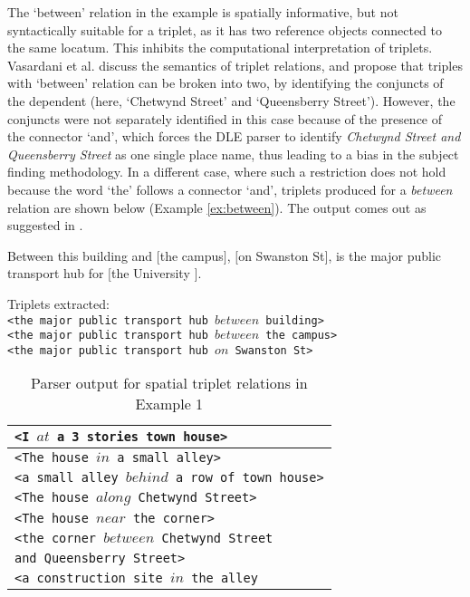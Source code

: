 \documentclass{acm_proc_article-sp}
\begin{document}
The `between' relation in the example is spatially informative, but not syntactically suitable for a triplet, as it has two reference objects connected to the same locatum. This inhibits the computational interpretation of triplets. Vasardani et al. \cite{maria:descriptions} discuss the semantics of triplet relations, and propose that triples with `between' relation can be broken into two, by identifying the conjuncts of the dependent (here, `Chetwynd Street' and `Queensberry Street'). However, the conjuncts were not separately identified in this case because of the presence of the connector `and', which forces the DLE parser to identify \textit{Chetwynd Street and Queensberry Street} as one single place name, thus leading to a bias in the subject finding methodology. In a different case, where such a restriction does not hold because the word `the' follows a connector `and', triplets produced for a \textit{between} relation are shown below (Example \ref{ex:between}). The output comes out as suggested in \cite{maria:descriptions}.
\begin{example}
\label{ex:between}
Between this building and $[$the campus$]$, $[$on Swanston St$]$, is the major public transport hub for $[$the University $]$.
\end{example}
Triplets extracted:\\
\texttt{<the major public transport hub $between$  building>} \\
\texttt{<the major public transport hub $between$  the campus>} \\
\texttt{<the major public transport hub $on$ Swanston St>}
\begin{table}
\begin{tabular}{|l|}
\hline
\texttt{<I $at$ a 3 stories town house>}  \\ \hline
\texttt{<The house $in$ a small alley>} \\ \hline
\texttt{<a small alley $behind$ a row of town house>}\\ \hline
\texttt{<The house $along$ Chetwynd Street>}\\ \hline
\texttt{<The house $near$ the corner>}\\ \hline
\texttt{<the corner $between$ Chetwynd Street} \\
\texttt{and Queensberry Street>}\\ \hline
\texttt{<a construction site $in$ the alley}\\ \hline
\end{tabular}
\caption{Parser output for spatial triplet relations in Example 1}
\label{table:ex1}
\end{table}
\end{document}
